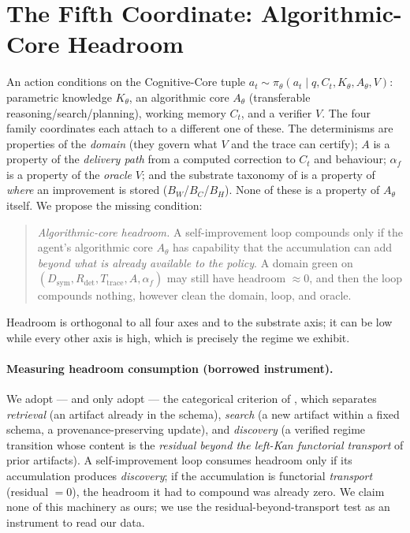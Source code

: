 \documentclass[11pt]{article}
\newcommand{\Dsym}{D_{\mathrm{sym}}}
\newcommand{\Rdet}{R_{\mathrm{det}}}
\newcommand{\Ttrace}{T_{\mathrm{trace}}}
\newcommand{\Ath}{A_{\theta}}
\newcommand{\af}{\alpha_f}
\begin{document}
\section{The Fifth Coordinate: Algorithmic-Core Headroom}\label{sec:coord}
An action conditions on the Cognitive-Core tuple
$a_t\sim\pi_\theta(a_t\mid q,C_t,K_\theta,\Ath,V)$: parametric knowledge $K_\theta$, an algorithmic core
$\Ath$ (transferable reasoning/search/planning), working memory $C_t$, and a verifier $V$. The four
family coordinates each attach to a different one of these. The determinisms are properties of the
\emph{domain} (they govern what $V$ and the trace can certify); $A$ is a property of the \emph{delivery
path} from a computed correction to $C_t$ and behaviour; $\af$ is a property of the \emph{oracle} $V$;
and the substrate taxonomy of \citet{determinismmanifold} is a property of \emph{where} an improvement
is stored ($B_W$/$B_C$/$B_H$). None of these is a property of $\Ath$ itself. We propose the missing
condition:
\begin{quote}
\emph{Algorithmic-core headroom.} A self-improvement loop compounds only if the agent's algorithmic core
$\Ath$ has capability that the accumulation can add \emph{beyond what is already available to the
policy}. A domain green on $(\Dsym,\Rdet,\Ttrace,A,\af)$ may still have headroom $\approx0$, and then the
loop compounds nothing, however clean the domain, loop, and oracle.
\end{quote}
Headroom is orthogonal to all four axes and to the substrate axis; it can be low while every other axis
is high, which is precisely the regime we exhibit.

\paragraph{Measuring headroom consumption (borrowed instrument).} We adopt --- and only adopt ---
the categorical criterion of \citet{wangbuehler2026}, which separates \emph{retrieval} (an artifact
already in the schema), \emph{search} (a new artifact within a fixed schema, a provenance-preserving
update), and \emph{discovery} (a verified regime transition whose content is the \emph{residual beyond
the left-Kan functorial transport} of prior artifacts). A self-improvement loop consumes headroom only
if its accumulation produces \emph{discovery}; if the accumulation is functorial \emph{transport}
(residual $=0$), the headroom it had to compound was already zero. We claim none of this machinery as
ours; we use the residual-beyond-transport test as an instrument to read our data.
\end{document}
